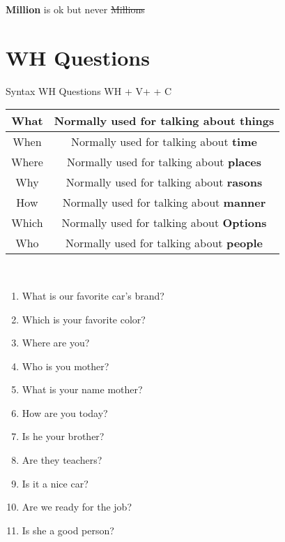 \documentclass{elegantbook}
\begin{document}
    \begin{note}
        \textbf{Million} is ok but  never \st{Millions}
    \end{note}
    \section{WH Questions}
    \begin{corollary}{Syntax WH Questions}{}
        WH + V+ \dSmiley[2]+ C
    \end{corollary}

    \begin{tabular}{|c|c|}
        \hline
        What&Normally used for talking about \textbf{things}\\
        \hline
        When&Normally used for talking about \textbf{time}\\
        \hline
        Where&Normally used for talking about \textbf{places}\\
        \hline
        Why&Normally used for talking about \textbf{rasons}\\
        \hline
        How&Normally used for talking about \textbf{manner}\\
        \hline
        Which&Normally used for talking about \textbf{Options}\\
        \hline
        Who&Normally used for talking about \textbf{people}\\
        \hline
    \end{tabular}
    \\
    \begin{example}
        \begin{enumerate}
            \item What is our favorite car's brand?
            \item Which is your favorite color?
            \item Where are you?
            \item Who is you mother?
            \item What is your name mother?
            \item How are you today?
            \item Is he your brother?
            \item Are they teachers?
            \item Is it a nice car?
            \item Are we ready for the job?
            \item Is she a good person?
        \end{enumerate}
    \end{example}
\end{document}
